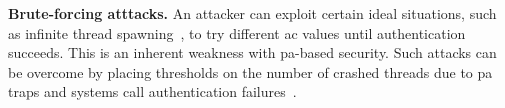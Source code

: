 




\textbf{Brute-forcing atttacks.}
An attacker can exploit certain ideal situations, such as infinite thread spawning~\cite{hackingblind}, to try different \gls{ac} values until authentication succeeds.
This is an inherent weakness with \gls{pa}-based security.
Such attacks can be overcome by placing thresholds on the number of crashed threads due to \gls{pa} traps and systems call authentication failures~\cite{kernel-pac}.



 




